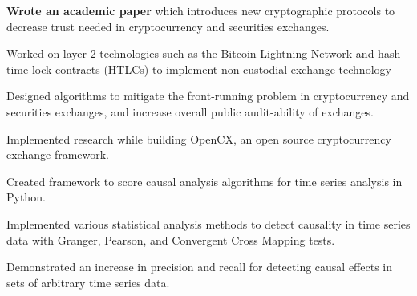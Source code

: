 
\begin{tightemize}
  \item \textbf{Wrote an academic paper} which introduces new cryptographic protocols to decrease trust needed in cryptocurrency and securities exchanges.
  \item Worked on layer 2 technologies such as the Bitcoin Lightning Network and hash time lock contracts (HTLCs) to implement non-custodial exchange technology
  \item Designed algorithms to mitigate the front-running problem in cryptocurrency and securities exchanges, and increase overall public audit-ability of exchanges.
  \item Implemented research while building OpenCX, an open source cryptocurrency exchange framework.
\end{tightemize}
\subsectionsep

\begin{tightemize}
\item Created framework to score causal analysis algorithms for time series
  analysis in Python.
\item Implemented various statistical analysis methods to detect causality in
  time series data with Granger, Pearson, and Convergent Cross Mapping tests.
\item Demonstrated an increase in precision and recall for detecting causal effects in sets of
  arbitrary time series data.
\end{tightemize}
\subsectionsep

